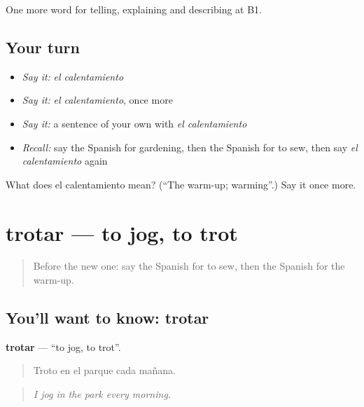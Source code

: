 \begin{grammarlens}[title={What you've built}]
One more word for telling, explaining and describing at B1.
\end{grammarlens}

\subsection*{Your turn}
\begin{itemize}
\raggedright
  \item \emph{Say it:} \emph{el calentamiento}
  \item \emph{Say it:} \emph{el calentamiento}, once more
  \item \emph{Say it:} a sentence of your own with \emph{el calentamiento}
  \item \emph{Recall:} say the Spanish for gardening, then the Spanish for to sew, then say \emph{el calentamiento} again
\end{itemize}

\begin{tcolorbox}[breakable,colback=teal!4,colframe=teal!35!black,title={Before you move on}]
What does el calentamiento mean? (\textquotedblleft{}The warm-up; warming\textquotedblright{}.) Say it once more.
\end{tcolorbox}
\section[trotar]{trotar — to jog, to trot}

\label{lesson:ES-C755-trotar}



\begin{quote}
Before the new one: say the Spanish for to sew, then the Spanish for the warm-up.
\end{quote}

\subsection*{You'll want to know: trotar}
\textbf{trotar} — \textquotedblleft{}to jog, to trot\textquotedblright{}.

\begin{quote}
Troto en el parque cada mañana.
\end{quote}

\begin{quote}
\emph{I jog in the park every morning.}
\end{quote}

